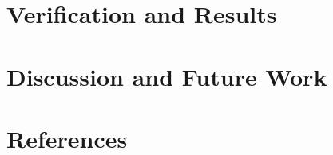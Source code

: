 \documentclass[11pt,twoside,final]{eitExjobb}  %
\begin{document}
\chapter{Verification and Results}


\chapter{Discussion and Future Work}



\appendix %
\label{ap:ap1}
\cleardoublepage
{}
\chapter*{References}
\printbibliography[heading=none]
\end{document}
